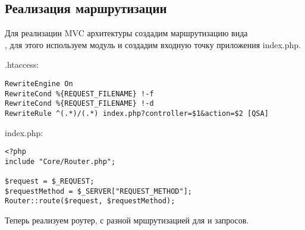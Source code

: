 \documentclass[a4paper,14pt]{extarticle}
\begin{document}
\subsection{Реализация маршрутизации}

Для реализации MVC архитектуры создадим маршрутизацию вида\\
, для этого используем  модуль и
создадим входную точку приложения index.php.

.htaccess:
\begin{lstlisting}
RewriteEngine On
RewriteCond %{REQUEST_FILENAME} !-f
RewriteCond %{REQUEST_FILENAME} !-d
RewriteRule ^(.*)/(.*) index.php?controller=$1&action=$2 [QSA]
\end{lstlisting}

index.php:
\begin{lstlisting}
<?php
include "Core/Router.php";

$request = $_REQUEST;
$requestMethod = $_SERVER["REQUEST_METHOD"];
Router::route($request, $requestMethod);
\end{lstlisting}

Теперь реализуем роутер, с разной мршрутизацией для  и 
запросов.
\end{document}
